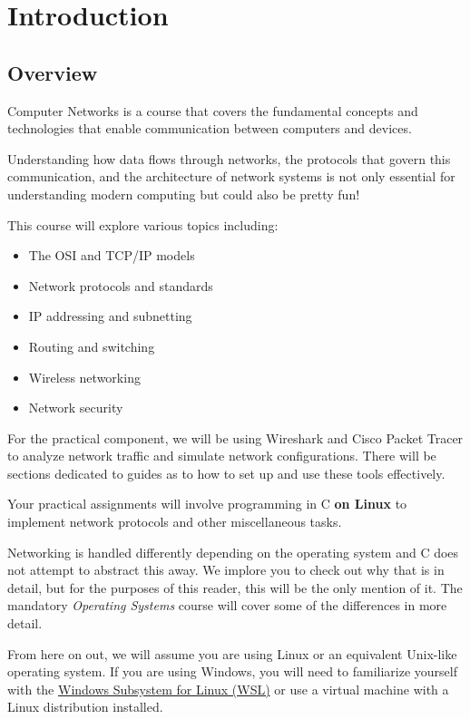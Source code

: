 \chapter{Introduction}
\section{Overview}
Computer Networks is a course that covers the fundamental concepts and technologies that enable communication between computers and devices. 

Understanding how data flows through networks, the protocols that govern this communication, and the architecture of network systems is not only essential for understanding modern computing but could also be pretty fun!

This course will explore various topics including:
\begin{itemize}
    \item The OSI and TCP/IP models
    \item Network protocols and standards
    \item IP addressing and subnetting
    \item Routing and switching
    \item Wireless networking
    \item Network security
\end{itemize}

For the practical component, we will be using Wireshark and Cisco Packet Tracer to analyze network traffic and simulate network configurations. There will be sections dedicated to guides as to how to set up and use these tools effectively.

Your practical assignments will involve programming in C \textbf{on Linux} to implement network protocols and other miscellaneous tasks.

\begin{importantblock}
Networking is handled differently depending on the operating system and C does not attempt to abstract this away. We implore you to check out why that is in detail, but for the purposes of this reader, this will be the only mention of it. The mandatory \textit{Operating Systems} course will cover some of the differences in more detail.

From here on out, we will assume you are using Linux or an equivalent Unix-like operating system. If you are using Windows, you will need to familiarize yourself with the \href{https://docs.microsoft.com/en-us/windows/wsl/install}{Windows Subsystem for Linux (WSL)} or use a virtual machine with a Linux distribution installed.
\end{importantblock}

